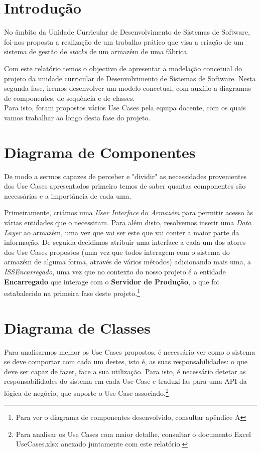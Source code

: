 \documentclass[a4paper]{report}
\begin{document}
\tableofcontents

\pagebreak

\chapter{Introdução}
No âmbito da Unidade Curricular de Desenvolvimento de Sistemas de Software, foi-nos proposta a realização de um trabalho prático que visa a criação de um sistema de gestão de \textit{stocks} de um armazém de uma fábrica.

Com este relatório temos o objectivo de apresentar a modelação concetual do projeto da unidade curricular de Desenvolvimento de Sistemas de Software. Nesta segunda fase, iremos desenvolver um modelo concetual, com auxílio a diagramas de componentes, de sequência e de classes.\\

Para isto, foram propostos vários Use Cases pela equipa docente, com os quais vamos trabalhar ao longo desta fase do projeto.



\chapter{Diagrama de Componentes}
    De modo a sermos capazes de perceber e "dividir" as necessidades provenientes dos Use Cases apresentados primeiro temos de saber quantas componentes são necessárias e a importância de cada uma.
    
    Primeiramente, criámos uma \textit{User Interface} do \textit{Armazém} para permitir acesso às várias entidades que o necessitam. Para além disto, resolvemos inserir uma \textit{Data Layer} ao armazém, uma vez que vai ser este que vai conter a maior parte da informação.
    De seguida decidimos atribuir uma interface a cada um dos atores dos Use Cases propostos (uma vez que todos interagem com o sistema do armazém de alguma forma, através de vários métodos) adicionando mais uma, a \textit{ISSEncarregado}, uma vez que no contexto do nosso projeto é a entidade \textbf{Encarregado} que interage com o \textbf{Servidor de Produção}, o que foi estabalecido na primeira fase deste projeto.\footnote{Para ver o diagrama de componentes desenvolvido, consultar apêndice A}
    


\chapter{Diagrama de Classes}
    Para analisarmos melhor os Use Cases propostos, é necessário ver como o sistema se deve comportar com cada um destes, isto é, as suas responsabilidades: o que deve ser capaz de fazer, face a sua utilização. Para isto, é necessário detetar as responsabilidades do sistema em cada Use Case e traduzi-las para uma API da lógica de negócio, que suporte o Use Case associado.\footnote{Para analisar os Use Cases com maior detalhe, consultar o documento Excel UseCases.xlsx anexado juntamente com este relatório.}
    
\end{document}
